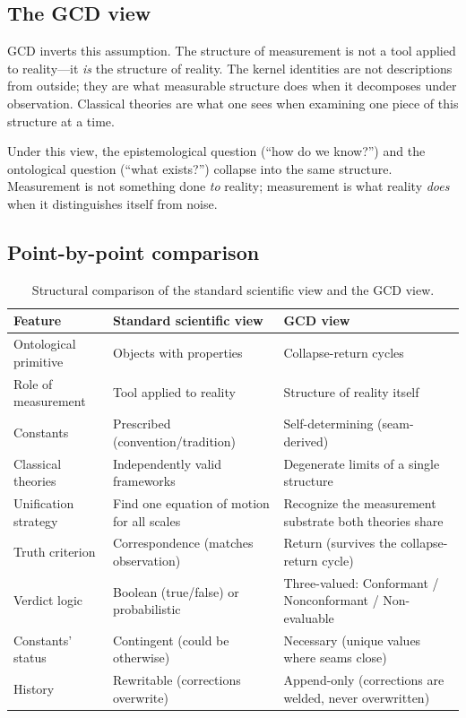 \documentclass[
  aps,
  prd,
  twocolumn,
  superscriptaddress,
  nofootinbib,
  floatfix
]{revtex4-2}
\begin{document}
\subsection{The GCD view}

GCD inverts this assumption.  The structure of measurement is not a
tool applied to reality---it \emph{is} the structure of reality.  The
kernel identities are not descriptions from outside; they are what
measurable structure does when it decomposes under observation.
Classical theories are what one sees when examining one piece of this
structure at a time.

Under this view, the epistemological question (``how do we know?'')
and the ontological question (``what exists?'') collapse into the same
structure.  Measurement is not something done \emph{to} reality;
measurement is what reality \emph{does} when it distinguishes itself
from noise.

\subsection{Point-by-point comparison}

\begin{table}[t]
\caption{\label{tab:comparison}Structural comparison of the standard
scientific view and the GCD view.}
\begin{ruledtabular}
\begin{tabular}{p{2.4cm}p{6.0cm}p{6.0cm}}
Feature & Standard scientific view & GCD view \\
\midrule
Ontological primitive &
  Objects with properties &
  Collapse-return cycles \\[4pt]
Role of measurement &
  Tool applied to reality &
  Structure of reality itself \\[4pt]
Constants &
  Prescribed (convention/tradition) &
  Self-determining (seam-derived) \\[4pt]
Classical theories &
  Independently valid frameworks &
  Degenerate limits of a single structure \\[4pt]
Unification strategy &
  Find one equation of motion for all scales &
  Recognize the measurement substrate both theories share \\[4pt]
Truth criterion &
  Correspondence (matches observation) &
  Return (survives the collapse-return cycle) \\[4pt]
Verdict logic &
  Boolean (true/false) or probabilistic &
  Three-valued: Conformant / Nonconformant / Non-evaluable \\[4pt]
Constants' status &
  Contingent (could be otherwise) &
  Necessary (unique values where seams close) \\[4pt]
History &
  Rewritable (corrections overwrite) &
  Append-only (corrections are welded, never overwritten)
\end{tabular}
\end{ruledtabular}
\end{table}
\end{document}
